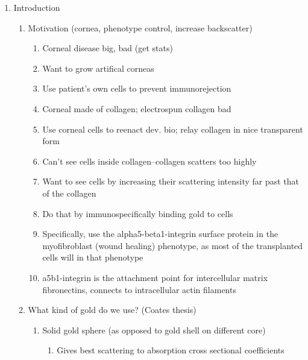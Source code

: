 \begin{enumerate}
\item Introduction

\begin{enumerate}
\item Motivation (cornea, phenotype control, increase backscatter)

\begin{enumerate}
\item Corneal disease big, bad (get stats)

\item Want to grow artifical corneas

\item Use patient's own cells to prevent immunorejection

\item Corneal made of collagen; electrospun collagen bad

\item Use corneal cells to reenact dev. bio; relay collagen in nice transparent form

\item Can't see cells inside collagen--collagen scatters too highly

\item Want to see cells by increasing their scattering intensity far past that of the collagen

\item Do that by immunospecifically binding gold to cells

\item Specifically, use the alpha5-beta1-integrin surface protein in the myofibroblast (wound healing) phenotype, as most of the transplanted cells will in that phenotype

\item a5b1-integrin is the attachment point for intercellular matrix fibronectins, connects to intracellular actin filaments

\end{enumerate}

\item What kind of gold do we use? (Coates thesis)

\begin{enumerate}
\item Solid gold sphere (as opposed to gold shell on different core)

\begin{enumerate}
\item Gives best scattering to absorption cross sectional coefficients


\end{enumerate}
\end{enumerate}
\end{enumerate}
\end{enumerate}

